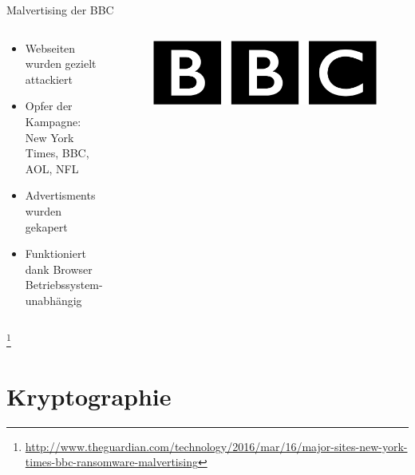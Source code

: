 \documentclass[10pt]{beamer}
\begin{document}
\begin{frame}{Malvertising der BBC}
	\begin{columns}
		\begin{column}{6cm}
			\begin{itemize}
				\item Webseiten wurden gezielt attackiert
				\item Opfer der Kampagne: New York Times, BBC, AOL, NFL
				\item Advertisments wurden gekapert
				\item Funktioniert dank Browser Betriebssystem-unabhängig
			\end{itemize}
		\end{column}
		\begin{column}{5cm}
			\begin{figure}[p]
				\centering
				\includegraphics[scale=0.1]{BBC.png}
			\end{figure}
		\end{column}
	\end{columns}
	\let\thefootnote\relax\footnote{\url{http://www.theguardian.com/technology/2016/mar/16/major-sites-new-york-times-bbc-ransomware-malvertising}}
\end{frame}


\section{Kryptographie}
\end{document}
